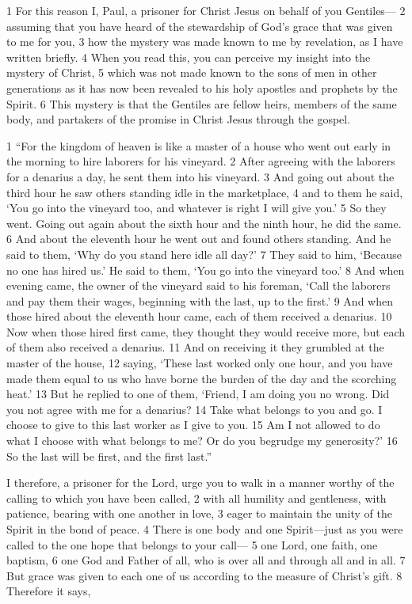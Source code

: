 \begin{bible}
1 For this reason I, Paul, a prisoner for Christ Jesus on behalf of you Gentiles— 2 assuming that you have heard of the stewardship of God's grace that was given to me for you, 3 how the mystery was made known to me by revelation, as I have written briefly. 4 When you read this, you can perceive my insight into the mystery of Christ, 5 which was not made known to the sons of men in other generations as it has now been revealed to his holy apostles and prophets by the Spirit. 6 This mystery is that the Gentiles are fellow heirs, members of the same body, and partakers of the promise in Christ Jesus through the gospel.



1 ``For the kingdom of heaven is like a master of a house who went out early in the morning to hire laborers for his vineyard. 2 After agreeing with the laborers for a denarius a day, he sent them into his vineyard. 3 And going out about the third hour he saw others standing idle in the marketplace, 4 and to them he said, ‘You go into the vineyard too, and whatever is right I will give you.’ 5 So they went. Going out again about the sixth hour and the ninth hour, he did the same. 6 And about the eleventh hour he went out and found others standing. And he said to them, ‘Why do you stand here idle all day?’ 7 They said to him, ‘Because no one has hired us.’ He said to them, ‘You go into the vineyard too.’ 8 And when evening came, the owner of the vineyard said to his foreman, ‘Call the laborers and pay them their wages, beginning with the last, up to the first.’ 9 And when those hired about the eleventh hour came, each of them received a denarius. 10 Now when those hired first came, they thought they would receive more, but each of them also received a denarius. 11 And on receiving it they grumbled at the master of the house, 12 saying, ‘These last worked only one hour, and you have made them equal to us who have borne the burden of the day and the scorching heat.’ 13 But he replied to one of them, ‘Friend, I am doing you no wrong. Did you not agree with me for a denarius? 14 Take what belongs to you and go. I choose to give to this last worker as I give to you. 15 Am I not allowed to do what I choose with what belongs to me? Or do you begrudge my generosity?’ 16 So the last will be first, and the first last.''

I therefore, a prisoner for the Lord, urge you to walk in a manner worthy of the calling to which you have been called, 2 with all humility and gentleness, with patience, bearing with one another in love, 3 eager to maintain the unity of the Spirit in the bond of peace. 4 There is one body and one Spirit—just as you were called to the one hope that belongs to your call— 5 one Lord, one faith, one baptism, 6 one God and Father of all, who is over all and through all and in all. 7 But grace was given to each one of us according to the measure of Christ's gift. 8 Therefore it says,


\end{bible}
